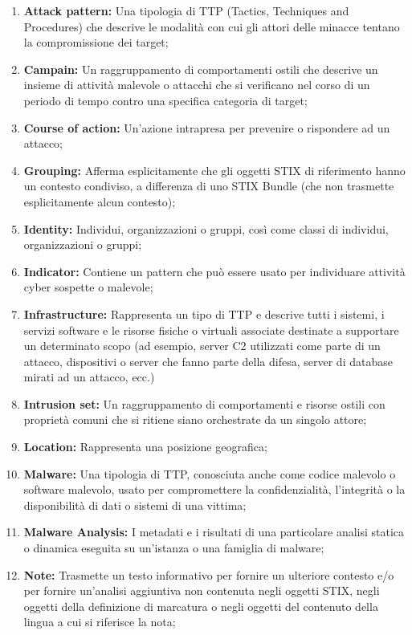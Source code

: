 \begin{enumerate}
    \item\textbf{Attack pattern:} Una tipologia di TTP (Tactics, Techniques and Procedures) che descrive le modalità con cui gli attori delle minacce tentano la compromissione dei target;
    \item\textbf{Campain:} Un raggruppamento di comportamenti ostili che descrive un insieme di attività malevole o attacchi che si verificano nel corso di un periodo di tempo contro una specifica categoria di target;
    \item\textbf{Course of action:} Un’azione intrapresa per prevenire o rispondere ad un attacco;
    \item\textbf{Grouping:} Afferma esplicitamente che gli oggetti STIX di riferimento hanno un contesto condiviso, a differenza di uno STIX Bundle (che non trasmette esplicitamente alcun contesto);
    \item\textbf{Identity:} Individui, organizzazioni o gruppi, così come classi di individui, organizzazioni o gruppi;
    \item\textbf{Indicator:} Contiene un pattern che può essere usato per individuare attività cyber sospette o malevole;
    \item\textbf{Infrastructure: } Rappresenta un tipo di TTP e descrive tutti i sistemi, i servizi software e le risorse fisiche o virtuali associate destinate a supportare un determinato scopo (ad esempio, server C2 utilizzati come parte di un attacco, dispositivi o server che fanno parte della difesa, server di database mirati ad un attacco, ecc.)
    \item\textbf{Intrusion set:} Un raggruppamento di comportamenti e risorse ostili con proprietà comuni che si ritiene siano orchestrate da un singolo attore;
    \item\textbf{Location:} Rappresenta una posizione geografica;
    \item\textbf{Malware:} Una tipologia di TTP, conosciuta anche come codice malevolo o software malevolo, usato per compromettere la confidenzialità, l’integrità o la disponibilità di dati o sistemi di una vittima;
    \item\textbf{Malware Analysis:} I metadati e i risultati di una particolare analisi statica o dinamica eseguita su un'istanza o una famiglia di malware;
     \item\textbf{Note:} Trasmette un testo informativo per fornire un ulteriore contesto e/o per fornire un'analisi aggiuntiva non contenuta negli oggetti STIX, negli oggetti della definizione di marcatura o negli oggetti del contenuto della lingua a cui si riferisce la nota;

\end{enumerate}
